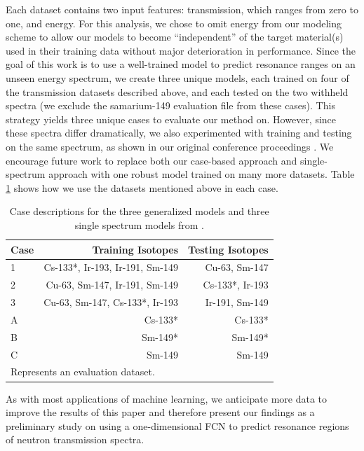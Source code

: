 \documentclass{style/nseJournal}
\begin{document}
Each dataset contains two input features: transmission, which ranges from zero to one, and energy. For this analysis, we chose to omit energy from our modeling scheme to allow our models to become ``independent'' of the target material(s) used in their training data without major deterioration in performance. Since the goal of this work is to use a well-trained model to predict resonance ranges on an unseen energy spectrum, we create three unique models, each trained on four of the transmission datasets described above, and each tested on the two withheld spectra (we exclude the samarium-149 evaluation file from these cases). This strategy yields three unique cases to evaluate our method on. However, since these spectra differ dramatically, we also experimented with training and testing on the same spectrum, as shown in our original conference proceedings \cite{PHYSOR}. We encourage future work to replace both our case-based approach and single-spectrum approach with one robust model trained on many more datasets. Table \ref{tab:case_outline} shows how we use the datasets mentioned above in each case. 

\begin{table}[!ht]
    \centering
    \caption{Case descriptions for the three generalized models and three single spectrum models from \cite{PHYSOR}.}
    \begin{tabular}{lrr}
        \toprule
         \textbf{Case}  & \textbf{Training Isotopes} & \textbf{Testing Isotopes}  \\
         \midrule
            1 & Cs-133*, Ir-193, Ir-191, Sm-149 & Cu-63, Sm-147 \\
            2 & Cu-63, Sm-147, Ir-191, Sm-149 & Cs-133*, Ir-193 \\
            3 & Cu-63, Sm-147, Cs-133*, Ir-193 & Ir-191, Sm-149 \\
            A & Cs-133* & Cs-133* \\
            B & Sm-149* & Sm-149* \\
            C & Sm-149 & Sm-149 \\
         \bottomrule
    \multicolumn{3}{l}{\small *Represents an evaluation dataset.} \\
    \end{tabular}
    \label{tab:case_outline}
\end{table}

As with most applications of machine learning, we anticipate more data to improve the results of this paper and therefore present our findings as a preliminary study on using a one-dimensional FCN to predict resonance regions of neutron transmission spectra. 
\end{document}
